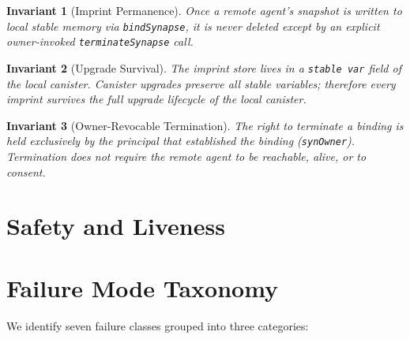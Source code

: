 \documentclass[11pt,a4paper]{article}
\newtheorem{invariant}{Invariant}
\begin{document}
\begin{invariant}[Imprint Permanence]
\label{inv:permanence}
Once a remote agent's snapshot is written to local stable memory via
\texttt{bindSynapse}, it is never deleted except by an explicit owner-invoked
\texttt{terminateSynapse} call.
\end{invariant}

\begin{invariant}[Upgrade Survival]
\label{inv:upgrade}
The imprint store lives in a \texttt{stable var} field of the local canister.
Canister upgrades preserve all stable variables; therefore every imprint
survives the full upgrade lifecycle of the local canister.
\end{invariant}

\begin{invariant}[Owner-Revocable Termination]
\label{inv:termination}
The right to terminate a binding is held exclusively by the principal that
established the binding (\texttt{synOwner}).  Termination does not require the
remote agent to be reachable, alive, or to consent.
\end{invariant}

\section{Safety and Liveness}
\label{sec:safety}


\section{Failure Mode Taxonomy}
\label{sec:failures}

We identify seven failure classes grouped into three categories:
\end{document}
